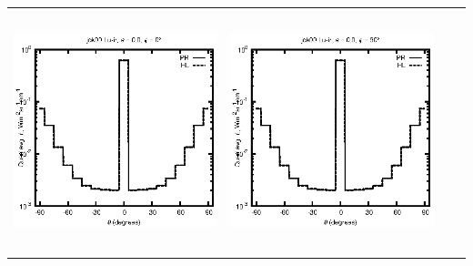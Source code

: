 \begin{tabular}{c c c c}
\includegraphics[height=7cm]{../eps/jok00_Lu_ir_fwd.eps} &
\includegraphics[height=7cm]{../eps/jok00_Lu_ir_cross.eps} \\
\end{tabular}

\pagebreak

